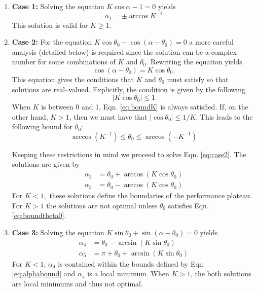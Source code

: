 \documentclass[12pt]{article}
\begin{document}
\begin{enumerate}
\item[]{\bf Case 1:} Solving the equation $K \cos \alpha - 1 = 0$ yields
\begin{equation*}
\alpha_1 = \pm \arccos K^{-1}
\end{equation*}
This solution is valid for $K\geq1.$

\item[]{\bf Case 2:} For the equation $K\cos \theta_0 - \cos(\alpha - \theta_0) = 0$ a more careful analysis (detailed below) is required since the solution can be a complex number for some combinations of $K$ and $\theta_0.$ Rewriting the equation yields 
%
\begin{equation}
\cos(\alpha - \theta_0) = K\cos \theta_0.
\label{eq:case2}
\end{equation}
%
This equation gives the conditions that $K$ and $\theta_0$ must satisfy so that solutions are real--valued. Explicitly, the condition is given by the following
%
\begin{equation}
 | K\cos \theta_0 | \leq 1
 \label{eq:boundK}
\end{equation}
%
When $K$ is between 0 and 1, Eqn. \ref{eq:boundK} is always satisfied. If, on the other hand, $K > 1$, then we must have that $| \cos \theta_0| \leq 1/K.$ This leads to the following bound for $\theta_0$:
%
\begin{equation}
\arccos (K^{-1}) \leq \theta_0 \leq \arccos (-K^{-1})
\label{eq:boundtheta0}
\end{equation}

Keeping these restrictions in mind we proceed to solve Eqn. \ref{eq:case2}. The solutions are given by
\begin{align*}
\alpha_2 & = \theta_0 + \arccos(K \cos \theta_0) \\
\alpha_3 & = \theta_0 - \arccos(K \cos \theta_0)
\end{align*}
For $K<1,$ these solutions define the boundaries of the performance plateau. For $K>1$ the solutions are not optimal unless $\theta_0$ satisfies Eqn. \ref{eq:boundtheta0}.

\item[]{\bf Case 3:} Solving the equation $K\sin \theta_0 + \sin(\alpha -\theta_0) = 0$ yields
\begin{align*}
\alpha_4 & = \theta_0 - \arcsin(K \sin \theta_0) \\
\alpha_5 & = \pi + \theta_0 + \arcsin(K \sin \theta_0)
\end{align*}
For $K<1$, $\alpha_4$ is contained within the bounds defined by Eqn. \ref{eq:alphabound} and $\alpha_5$ is a local minimum. When $K>1$, the both solutions are local minimums and thus not optimal.     
\end{enumerate}
\end{document}
